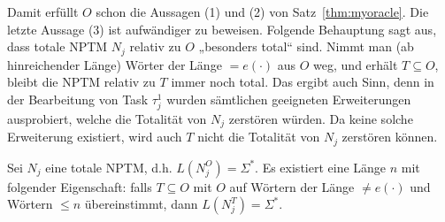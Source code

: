 Damit erfüllt $O$ schon die Aussagen (1) und (2) von Satz~\ref{thm:myoracle}. Die letzte Aussage (3) ist aufwändiger zu beweisen.
Folgende Behauptung sagt aus, dass totale NPTM $N_j$ relativ zu $O$ „besonders total“ sind. Nimmt man (ab hinreichender Länge) Wörter der Länge $=e(\cdot)$ aus $O$ weg, und erhält $T\subseteq O$, bleibt die NPTM relativ zu $T$ immer noch total. Das ergibt auch Sinn, denn in der Bearbeitung von Task $\tau^1_j$ wurden sämtlichen geeigneten Erweiterungen ausprobiert, welche die Totalität von $N_j$ zerstören würden. Da keine solche Erweiterung existiert, wird auch $T$ nicht die Totalität von $N_j$ zerstören können.

\begin{claim}\label{claim:myoracle-totality}
    Sei $N_j$ eine totale NPTM, d.h. $L(N_j^O)=\Sigma^*$.
    Es existiert eine Länge $n$ mit folgender Eigenschaft: 
    falls $T\subseteq O$ mit $O$ auf Wörtern der Länge $\neq e(\cdot)$ und Wörtern $\leq n$ übereinstimmt, dann $L(N_j^T)=\Sigma^*$.
\end{claim}
